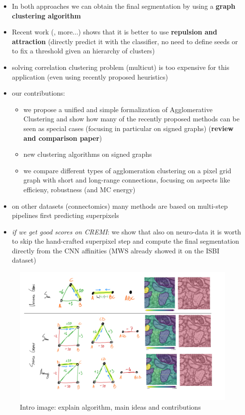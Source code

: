 \begin{itemize}
\item In both approaches we can obtain the final segmentation by using a \textbf{graph clustering algorithm}
\item Recent work (\cite{wolf2018mutex}, more...) shows that it is better to use \textbf{repulsion and attraction} (directly predict it with the classifier, no need to define seeds or to fix a threshold given an hierarchy of clusters)
\item solving correlation clustering problem (multicut) is too expensive for this application (even using recently proposed heuristics)
\item our contributions:
\begin{itemize}
\item we propose a unified and simple formalization of Agglomerative Clustering and show how many of the recently proposed methods can be seen as special cases (focusing in particular on signed graphs) (\textbf{review and comparison paper})
\item new clustering algorithms on signed graphs
\item we compare different types of agglomeration clustering on a pixel grid graph with short and long-range connections, focusing on aspects like efficieny, robustness (and MC energy) 

\end{itemize}
\item on other datasets (connectomics) many methods are based on multi-step pipelines first predicting superpixels
\item \textit{if we get good scores on CREMI}: we show that also on neuro-data it is worth to skip the hand-crafted superpixel step and compute the final segmentation directly from the CNN affinities (MWS already showed it on the ISBI dataset)

\end{itemize}


\begin{figure}[t]
\centering
\includegraphics[width=\textwidth,trim=0.4in 1.2in 0.in 0.05in,clip]{./figs/intro_image.jpg} %
\caption{\small 
Intro image: explain algorithm, main ideas and contributions
\label{fig:intro_figure}}
\end{figure}
